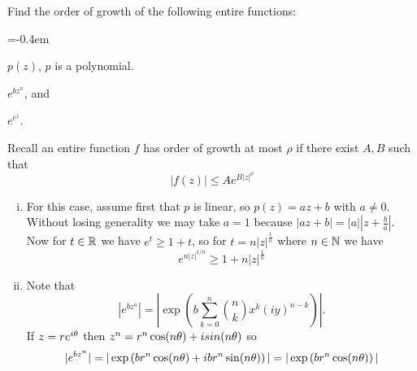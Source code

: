 \documentclass[12pt]{memoir}
\begin{document}
\begin{Ej}
    Find the order of growth of the following entire functions:
    \begin{enumerate}[i)]
        \itemsep=-0.4em
        \begin{multicols}{3}
        \item $p(z)$, $p$ is a polynomial.
        \item $e^{bz^n}$, and
        \item $e^{e^z}$.
        \end{multicols}
    \end{enumerate}
\end{Ej}

\begin{ptcbr}
    Recall an entire function $f$ has order of growth at most $\rho$ if there exist $A,B$ such that 
    $$|f(z)|\leq Ae^{B|z|^\rho}$$
    \begin{enumerate}[i)]
        \itemsep=-0.4em
        \item For this case, assume first that $p$ is linear, so $p(z)=az+b$ with $a\neq 0$. Without losing generality we may take $a=1$ because $|az+b|=|a|\left|z+\frac{b}{a}\right|$. Now for $t\in\mathbb{R}$ we have $e^{t}\geq 1+t$, so for $t=n|z|^{\frac{1}{n}}$ where $n\in\mathbb{N}$ we have 
        $$e^{n|z|^{1/n}}\geq 1+n|z|^{\frac{1}{n}}$$
        \item Note that 
        $$|e^{bz^n}|=\left|\exp\left(b\sum_{k=0}^n\binom{n}{k}x^k(iy)^{n-k}\right)\right|.$$
        If $z=re^{i\theta}$ then $z^n=r^n\cos(n\theta)+isin(n\theta)$ so
        $$|e^{bz^n}|=|\exp\left(br^n\cos(n\theta)+ibr^n\sin(n\theta)\right)|=|\exp\left(br^n\cos(n\theta)\right)|$$ 
    \end{enumerate}
\end{ptcbr}
\end{document}
